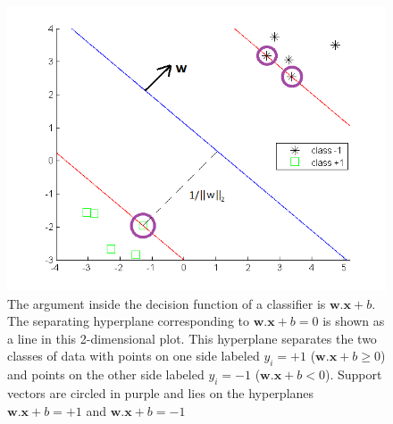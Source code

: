 \begin{figure}
\centering
\includegraphics[width=0.6\linewidth]{images/Separatrice_lineaire_avec_marges2}
\caption{The argument inside the decision function of a classifier is $\textbf{w}.\textbf{x} + b$. The separating hyperplane corresponding to $\textbf{w}.\textbf{x} + b = 0$ is shown as a line in this 2-dimensional plot. This hyperplane separates the two classes of data with points on one side labeled $y_i = +1$ ($\textbf{w}.\textbf{x} + b \geq 0$) and points on the other side labeled $y_i=-1$ ($\textbf{w}.\textbf{x} + b < 0$). Support vectors are circled in purple and lies on the hyperplanes $\textbf{w}.\textbf{x} + b = +1$ and $\textbf{w}.\textbf{x} + b = -1$}
\label{fig:Separatrice_lineaire_avec_marges}
\end{figure}




